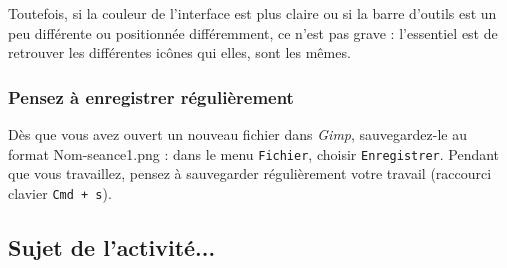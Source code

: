 Toutefois, si la couleur de l'interface est plus claire ou si la barre d'outils est un peu différente ou positionnée différemment, ce n'est pas grave : l'essentiel est de retrouver les différentes icônes qui elles, sont les mêmes.

\subsubsection{Pensez à enregistrer régulièrement}

Dès que vous avez ouvert un nouveau fichier dans \emph{Gimp}, sauvegardez-le au format Nom-seance1.png : dans le menu \texttt{Fichier}, choisir \texttt{Enregistrer}. Pendant que vous travaillez, pensez à sauvegarder régulièrement votre travail (raccourci clavier \texttt{Cmd + s}).   


\vfill
\phantom{rien}

\subsection{Sujet de l'activité...}

\vspace{10pt}

